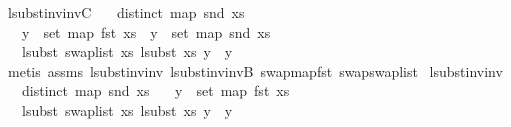 \begin{isabellebody}
{\isafoldproof}%
%
\isadelimproof
\isanewline
%
\endisadelimproof
\isanewline
\isanewline
{}\isamarkupfalse%
\ lsubst{\isacharunderscore}{\kern0pt}inv{\isacharunderscore}{\kern0pt}invC{\isacharcolon}{\kern0pt}\isanewline
\ \ \ {\isachardoublequoteopen}distinct\ {\isacharparenleft}{\kern0pt}map\ snd\ xs{\isacharparenright}{\kern0pt}{\isachardoublequoteclose}\isanewline
\ \ \ {\isachardoublequoteopen}y\ {\isasymnotin}\ set\ {\isacharparenleft}{\kern0pt}map\ fst\ xs{\isacharparenright}{\kern0pt}\ {\isacharminus}{\kern0pt}{\isacharminus}{\kern0pt}{\isachargreater}{\kern0pt}\ y\ {\isasymnotin}\ set\ {\isacharparenleft}{\kern0pt}map\ snd\ xs{\isacharparenright}{\kern0pt}{\isachardoublequoteclose}\isanewline
\ \ \ {\isachardoublequoteopen}lsubst\ {\isacharparenleft}{\kern0pt}swap{\isacharunderscore}{\kern0pt}list\ xs{\isacharparenright}{\kern0pt}\ {\isacharparenleft}{\kern0pt}lsubst\ xs\ y{\isacharparenright}{\kern0pt}\ {\isacharequal}{\kern0pt}\ y{\isachardoublequoteclose}\isanewline
%
\isadelimproof
%
\endisadelimproof
%
\isatagproof
{}\isamarkupfalse%
\ {\isacharparenleft}{\kern0pt}metis\ assms{\isacharparenleft}{\kern0pt}{}{\isacharcomma}{\kern0pt}{}{\isacharparenright}{\kern0pt}\ lsubst{\isacharunderscore}{\kern0pt}inv{\isacharunderscore}{\kern0pt}inv\ lsubst{\isacharunderscore}{\kern0pt}inv{\isacharunderscore}{\kern0pt}invB\ swap{\isacharunderscore}{\kern0pt}map{\isacharunderscore}{\kern0pt}fst\ swap{\isacharunderscore}{\kern0pt}swap{\isacharunderscore}{\kern0pt}list{\isacharparenright}{\kern0pt}%
\endisatagproof
{\isafoldproof}%
%
\isadelimproof
\isanewline
%
\endisadelimproof
\isanewline
\isanewline
{}\isamarkupfalse%
\ lsubst{\isacharunderscore}{\kern0pt}inv{\isacharunderscore}{\kern0pt}inv{}{\isacharcolon}{\kern0pt}\isanewline
\ \ \ {\isachardoublequoteopen}distinct\ {\isacharparenleft}{\kern0pt}map\ snd\ xs{\isacharparenright}{\kern0pt}{\isachardoublequoteclose}\isanewline
\ \ \ {\isachardoublequoteopen}y\ {\isasymin}\ set\ {\isacharparenleft}{\kern0pt}map\ fst\ xs{\isacharparenright}{\kern0pt}{\isachardoublequoteclose}\isanewline
\ \ \ {\isachardoublequoteopen}lsubst\ {\isacharparenleft}{\kern0pt}swap{\isacharunderscore}{\kern0pt}list\ xs{\isacharparenright}{\kern0pt}\ {\isacharparenleft}{\kern0pt}lsubst\ xs\ y{\isacharparenright}{\kern0pt}\ {\isacharequal}{\kern0pt}\ y{\isachardoublequoteclose}\isanewline
%
\isadelimproof
%

\end{isabellebody}
